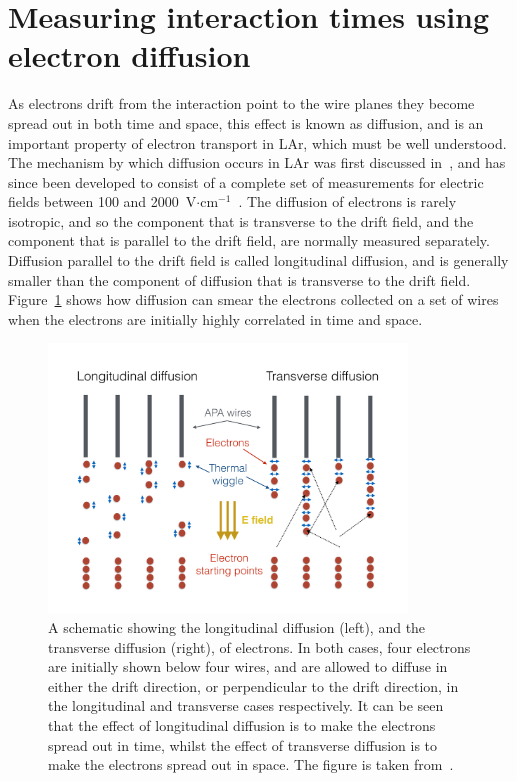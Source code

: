 \section{Measuring interaction times using electron diffusion}  \label{sec:DiffusionAnalysis}%
As electrons drift from the interaction point to the wire planes they become spread out in both time and space, this effect is known as diffusion, and is an important property of electron transport in LAr, which must be well understood. The mechanism by which diffusion occurs in LAr was first discussed in~\citep{1974NucIM.122..319D, Derenzo, PhysRevA.20.2547, Atrazhev-Timoshkin}, and has since been developed to consist of a complete set of measurements for electric fields between 100 and 2000~V$\cdot$cm$^{-1}$~\citep{Li:2015rqa}. The diffusion of electrons is rarely isotropic, and so the component that is transverse to the drift field, and the component that is parallel to the drift field, are normally measured separately. Diffusion parallel to the drift field is called longitudinal diffusion, and is generally smaller than the component of diffusion that is transverse to the drift field. Figure~\ref{fig:DomDiffSchem} shows how diffusion can smear the electrons collected on a set of wires when the electrons are initially highly correlated in time and space. \\

\begin{figure}
  \centering
  \includegraphics[width=0.85\textwidth]{DiffusionSchematic}
  \caption[Schematic showing the process of diffusion]
          {A schematic showing the longitudinal diffusion (left), and the transverse diffusion (right), of electrons. In both cases, four electrons are initially shown below four wires, and are allowed to diffuse in either the drift direction, or perpendicular to the drift direction, in the longitudinal and transverse cases respectively. It can be seen that the effect of longitudinal diffusion is to make the electrons spread out in time, whilst the effect of transverse diffusion is to make the electrons spread out in space. The figure is taken from~\citep{DomSeptMeeting}.}
  \label{fig:DomDiffSchem}
\end{figure}

